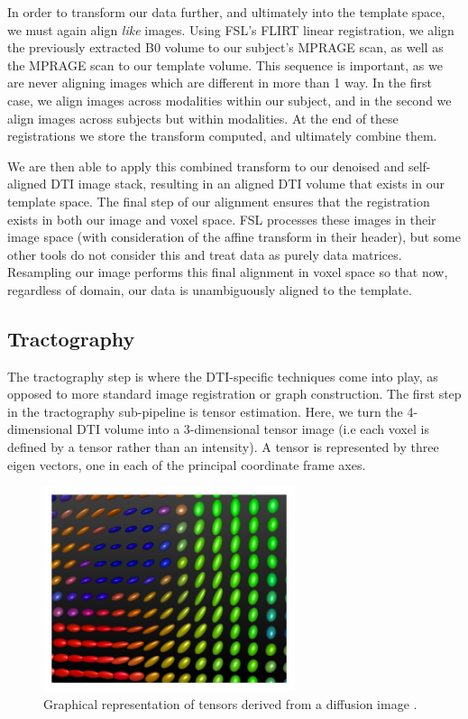 In order to transform our data further, and ultimately into the template space, we must again align \textit{like} images. Using FSL's FLIRT linear registration, we align the previously extracted B0 volume to our subject's MPRAGE scan, as well as the MPRAGE scan to our template volume. This sequence is important, as we are never aligning images which are different in more than 1 way. In the first case, we align images across modalities within our subject, and in the second we align images across subjects but within modalities. At the end of these registrations we store the transform computed, and ultimately combine them.

We are then able to apply this combined transform to our denoised and self-aligned DTI image stack, resulting in an aligned DTI volume that exists in our template space. The final step of our alignment ensures that the registration exists in both our image and voxel space. FSL processes these images in their image space (with consideration of the affine transform in their header), but some other tools do not consider this and treat data as purely data matrices. Resampling our image performs this final alignment in voxel space so that now, regardless of domain, our data is unambiguously aligned to the template.

\subsection{Tractography}
\label{sec:track}
The tractography step is where the DTI-specific techniques come into play, as opposed to more standard image registration or graph construction. The first step in the tractography sub-pipeline is tensor estimation.  Here, we turn the 4-dimensional DTI volume into a 3-dimensional tensor image (i.e each voxel is defined by a tensor rather than an intensity). A tensor is represented by three eigen vectors, one in each of the principal coordinate frame axes.

\begin{figure}[h!]
\centering
\includegraphics[height=60mm]{./figs/tensors.jpg}
\makeatletter
\let\@currsize\normalsize
\caption{Graphical representation of tensors derived from a diffusion image \cite{van2011cuda}.}
\label{fig:tensors}
\end{figure}

